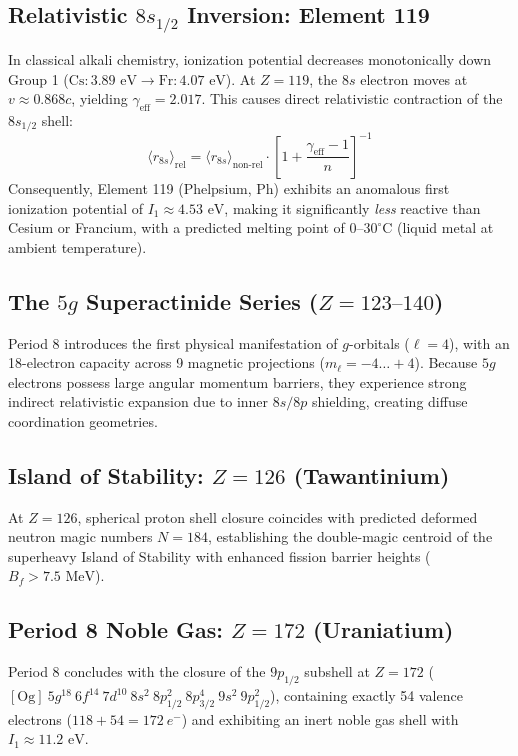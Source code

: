 \documentclass[10pt,twocolumn,a4paper]{article}
\begin{document}
\subsection{\texorpdfstring{Relativistic $8s_{1/2}$ Inversion: Element 119}{Relativistic 8s1/2 Inversion: Element 119}}
In classical alkali chemistry, ionization potential decreases monotonically down Group 1 ($\text{Cs}: 3.89\text{ eV} \to \text{Fr}: 4.07\text{ eV}$). At $Z = 119$, the $8s$ electron moves at $v \approx 0.868c$, yielding $\gamma_{\text{eff}} = 2.017$. This causes direct relativistic contraction of the $8s_{1/2}$ shell:
\begin{equation}
\langle r_{8s} \rangle_{\text{rel}} = \langle r_{8s} \rangle_{\text{non-rel}} \cdot \left[1 + \frac{\gamma_{\text{eff}} - 1}{n}\right]^{-1}
\end{equation}
Consequently, Element 119 (Phelpsium, $\text{Ph}$) exhibits an anomalous first ionization potential of $I_1 \approx 4.53\text{ eV}$, making it significantly \textit{less} reactive than Cesium or Francium, with a predicted melting point of $0\text{--}30^\circ\text{C}$ (liquid metal at ambient temperature).

\subsection{\texorpdfstring{The $5g$ Superactinide Series ($Z = 123\text{--}140$)}{The 5g Superactinide Series (Z = 123-140)}}
Period 8 introduces the first physical manifestation of $g$-orbitals ($\ell = 4$), with an 18-electron capacity across 9 magnetic projections ($m_\ell = -4\dots +4$). Because $5g$ electrons possess large angular momentum barriers, they experience strong indirect relativistic expansion due to inner $8s/8p$ shielding, creating diffuse coordination geometries.

\subsection{\texorpdfstring{Island of Stability: $Z = 126$ (Tawantinium)}{Island of Stability: Z = 126 (Tawantinium)}}
At $Z = 126$, spherical proton shell closure coincides with predicted deformed neutron magic numbers $N = 184$, establishing the double-magic centroid of the superheavy Island of Stability with enhanced fission barrier heights ($B_f > 7.5\text{ MeV}$).

\subsection{\texorpdfstring{Period 8 Noble Gas: $Z = 172$ (Uraniatium)}{Period 8 Noble Gas: Z = 172 (Uraniatium)}}
Period 8 concludes with the closure of the $9p_{1/2}$ subshell at $Z = 172$ ($[\text{Og}]\ 5g^{18}\ 6f^{14}\ 7d^{10}\ 8s^2\ 8p_{1/2}^2\ 8p_{3/2}^4\ 9s^2\ 9p_{1/2}^2$), containing exactly 54 valence electrons ($118 + 54 = 172\ e^-$) and exhibiting an inert noble gas shell with $I_1 \approx 11.2\text{ eV}$.
\end{document}
